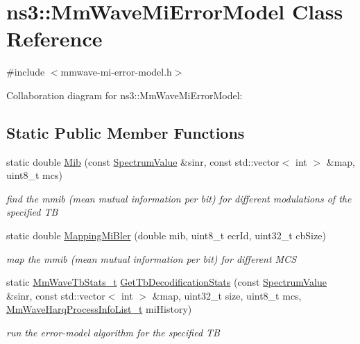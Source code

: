 \hypertarget{classns3_1_1MmWaveMiErrorModel}{}\section{ns3\+:\+:Mm\+Wave\+Mi\+Error\+Model Class Reference}
\label{classns3_1_1MmWaveMiErrorModel}


{\ttfamily \#include $<$mmwave-\/mi-\/error-\/model.\+h$>$}



Collaboration diagram for ns3\+:\+:Mm\+Wave\+Mi\+Error\+Model\+:
\subsection*{Static Public Member Functions}
\begin{DoxyCompactItemize}
\item 
static double \hyperlink{classns3_1_1MmWaveMiErrorModel_aace9efaf2ef6d1dfbbfa3fb49c29a977}{Mib} (const \hyperlink{classns3_1_1SpectrumValue}{Spectrum\+Value} \&sinr, const std\+::vector$<$ int $>$ \&map, uint8\+\_\+t mcs)
\begin{DoxyCompactList}\small\item\em find the mmib (mean mutual information per bit) for different modulations of the specified TB \end{DoxyCompactList}\item 
static double \hyperlink{classns3_1_1MmWaveMiErrorModel_affc0eda2aaaa9f5a8bbc8f532ae7adfb}{Mapping\+Mi\+Bler} (double mib, uint8\+\_\+t ecr\+Id, uint32\+\_\+t cb\+Size)
\begin{DoxyCompactList}\small\item\em map the mmib (mean mutual information per bit) for different M\+CS \end{DoxyCompactList}\item 
static \hyperlink{structns3_1_1MmWaveTbStats__t}{Mm\+Wave\+Tb\+Stats\+\_\+t} \hyperlink{classns3_1_1MmWaveMiErrorModel_a82a14ebf85ae03a7815215c3c1a96cc7}{Get\+Tb\+Decodification\+Stats} (const \hyperlink{classns3_1_1SpectrumValue}{Spectrum\+Value} \&sinr, const std\+::vector$<$ int $>$ \&map, uint32\+\_\+t size, uint8\+\_\+t mcs, \hyperlink{namespacens3_aca7c6bab455c2515f3e437749b5e904d}{Mm\+Wave\+Harq\+Process\+Info\+List\+\_\+t} mi\+History)
\begin{DoxyCompactList}\small\item\em run the error-\/model algorithm for the specified TB \end{DoxyCompactList}\end{DoxyCompactItemize}


